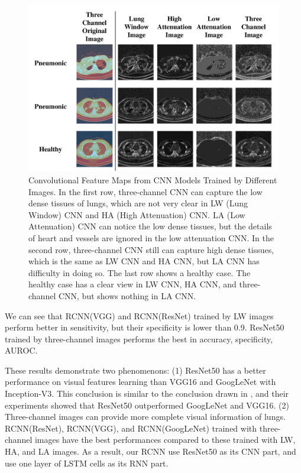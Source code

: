 \documentclass[journal]{IEEEtran}
\begin{document}
\begin{figure}[t]
    \centerline{\includegraphics[width=150mm]{show.pdf}}
    \vspace{-0cm}
    \caption{Convolutional Feature Maps from CNN Models Trained by Different Images. In the first row, three-channel CNN can capture the low dense tissues of lungs, which are not very clear in LW (Lung Window) CNN and HA (High Attenuation) CNN. LA (Low Attenuation) CNN can notice the low dense tissues, but the details of heart and vessels are ignored in the low attenuation CNN. 
    In the second row, three-channel CNN still can capture high dense tissues, which is the same as LW CNN and HA CNN, but LA CNN has difficulty in doing so. The last row shows a healthy case. The healthy case has a clear view in LW CNN, HA CNN, and three-channel CNN, but shows nothing in LA CNN.}
    \vspace{-0cm}
    \label{show}
    \end{figure}

We can see that RCNN(VGG) and RCNN(ResNet) trained by LW images perform better in sensitivity, but their specificity is lower than 0.9. ResNet50 trained by three-channel images performs the best in accuracy, specificity, AUROC.

These results demonstrate two phenomenons: (1) ResNet50 has a better performance on visual features learning than VGG16 and GoogLeNet with Inception-V3. This conclusion is similar to the conclusion drawn in \cite{Wang2017ChestX}, and their experiments showed that ResNet50 outperformed GoogLeNet and VGG16. (2) Three-channel images can provide more complete visual information of lungs. RCNN(ResNet), RCNN(VGG), and RCNN(GoogLeNet) trained with three-channel images have the best performances compared to these trained with LW, HA, and LA images. 
As a result, our RCNN use ResNet50 as its CNN part, and use one layer of LSTM cells as its RNN part. 
\end{document}
